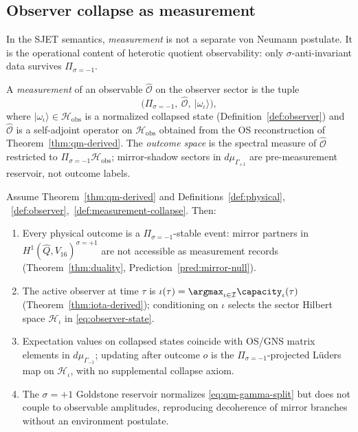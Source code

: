 \subsection{Observer collapse as measurement}

In the SJET semantics, \emph{measurement} is not a separate von Neumann
postulate. It is the operational content of heterotic quotient
observability: only $\sigma$-anti-invariant data survives
$\Pi_{\sigma=-1}$.

\begin{definition}\label{def:measurement-collapse}
A \emph{measurement} of an observable $\hat{\mathcal{O}}$ on the observer
sector is the tuple
\begin{equation}\label{eq:measurement-tuple}
  \bigl(\Pi_{\sigma=-1},\ \hat{\mathcal{O}},\ |\omega_\iota\rangle\bigr),
\end{equation}
where $|\omega_\iota\rangle\in\mathcal{H}_{\mathrm{obs}}$ is a normalized
collapsed state (Definition~\ref{def:observer}) and $\hat{\mathcal{O}}$ is a
self-adjoint operator on $\mathcal{H}_{\mathrm{obs}}$ obtained from the OS
reconstruction of Theorem~\ref{thm:qm-derived}. The \emph{outcome space} is the
spectral measure of $\hat{\mathcal{O}}$ restricted to
$\Pi_{\sigma=-1}\mathcal{H}_{\mathrm{obs}}$; mirror-shadow sectors in
$d\mu_{\Gamma_{+1}}$ are pre-measurement reservoir, not outcome labels.
\end{definition}

\begin{theorem}
\label{thm:measurement-collapse}
Assume Theorem~\ref{thm:qm-derived} and Definitions~\ref{def:physical},
~\ref{def:observer},~\ref{def:measurement-collapse}. Then:
\begin{enumerate}[label=(\roman*),leftmargin=*]
  \item Every physical outcome is a $\Pi_{\sigma=-1}$-stable event: mirror
    partners in $H^1(\hat Q,V_{16})^{\sigma=+1}$ are not accessible as
    measurement records (Theorem~\ref{thm:duality},
    Prediction~\ref{pred:mirror-null}).
  \item The active observer at time $\tau$ is
    $\iota(\tau)=\argmax_{\iota\in\mathcal{I}}\capacity_\iota(\tau)$
    (Theorem~\ref{thm:iota-derived}); conditioning on $\iota$ selects the
    sector Hilbert space $\mathcal{H}_\iota$ in \eqref{eq:observer-state}.
  \item Expectation values on collapsed states coincide with OS/GNS matrix
    elements in $d\mu_{\Gamma_{-1}}$; updating after outcome $o$ is the
    $\Pi_{\sigma=-1}$-projected L\"uders map on $\mathcal{H}_\iota$, with no
    supplemental collapse axiom.
  \item The $\sigma=+1$ Goldstone reservoir normalizes
    \eqref{eq:qm-gamma-split} but does not couple to observable amplitudes,
    reproducing decoherence of mirror branches without an environment
    postulate.
\end{enumerate}
\end{theorem}

